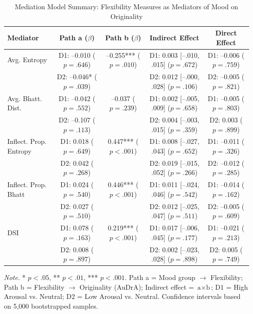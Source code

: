 \documentclass[../MA_Thesis.tex]{subfiles}
\begin{document}
\begin{table}[H]
{\fontsize{9pt}{11pt}\selectfont
\centering
\caption{Mediation Model Summary: Flexibility Measures as Mediators of Mood on Originality}
\label{tab:mediation_summary}
\begin{tabular}{lcccc}
\toprule
\textbf{Mediator} & \textbf{Path a} ($\beta$) & \textbf{Path b} ($\beta$) & \textbf{Indirect Effect} & \textbf{Direct Effect} \\
\midrule
Avg. Entropy & D1: –0.010 ($p = .646$) & –0.255*** ($p = .010$) & D1: 0.003 [–.010, .015] ($p = .672$) & D1: –0.006 ($p = .759$) \\
             & D2: –0.046* ($p = .039$) &                         & D2: 0.012 [–.000, .028] ($p = .106$) & D2: –0.005 ($p = .821$) \\
\addlinespace
Avg. Bhatt. Dist. & D1: –0.042 ($p = .552$) & –0.037 ($p = .239$) & D1: 0.002 [–.005, .009] ($p = .658$) & D1: –0.005 ($p = .803$) \\
                  & D2: –0.107 ($p = .113$) &                     & D2: 0.004 [–.003, .015] ($p = .359$) & D2:  0.003 ($p = .899$) \\
\addlinespace
Inflect. Prop. Entropy & D1:  0.018 ($p = .649$) &  0.447*** ($p < .001$) & D1: 0.008 [–.027, .043] ($p = .652$) & D1: –0.011 ($p = .326$) \\
                       & D2:  0.042 ($p = .268$) &                         & D2: 0.019 [–.015, .052] ($p = .266$) & D2: –0.012 ($p = .285$) \\
\addlinespace
Inflect. Prop. Bhatt & D1:  0.024 ($p = .540$) &  0.446*** ($p < .001$) & D1: 0.011 [–.024, .046] ($p = .542$) & D1: –0.014 ($p = .162$) \\
                     & D2:  0.027 ($p = .510$) &                        & D2: 0.012 [–.025, .047] ($p = .511$) & D2: –0.005 ($p = .609$) \\
\addlinespace
DSI & D1: 0.078 ($p = .163$) & 0.219*** ($p < .001$) & D1: 0.017 [–.006, .045] ($p = .177$) & D1: –0.021 ($p = .213$) \\
    & D2: 0.008 ($p = .897$) &                        & D2: 0.002 [–.023, .028] ($p = .898$) & D2:  0.005 ($p = .749$) \\
\bottomrule
\end{tabular}
\begin{tablenotes}[flushleft]
\small
\item \textit{Note.} * $p < .05$, ** $p < .01$, *** $p < .001$. Path a = Mood group $\rightarrow$ Flexibility; Path b = Flexibility $\rightarrow$ Originality (AuDrA); Indirect effect = $\text{a} \times \text{b}$; D1 = High Arousal vs. Neutral; D2 = Low Arousal vs. Neutral. Confidence intervals based on 5,000 bootstrapped samples.
\end{tablenotes}
}
\end{table}
\end{document}
